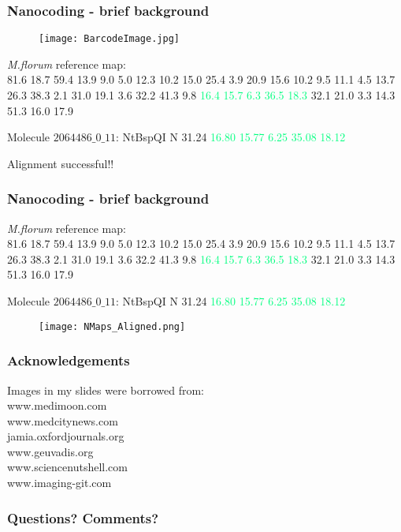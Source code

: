 \documentclass[10pt,dvipsnames,table, notes]{beamer}
\begin{document}
\begin{frame}
\frametitle{Nanocoding - brief background}
\begin{figure}[T]
\texttt{[image: BarcodeImage.jpg]}
\end{figure}

{\emph{M.florum}} reference map: \\
81.6 18.7 59.4 13.9 9.0 5.0 12.3 10.2 15.0 25.4 3.9 20.9 15.6 10.2 9.5 11.1 4.5 
13.7 26.3 38.3 2.1 31.0 19.1 3.6 32.2 41.3 9.8 \textcolor<3>{SpringGreen}{16.4 15.7 6.3 36.5 18.3} 32.1 21.0 
3.3 14.3 51.3 16.0 17.9

\pause
Molecule $2064486\_0\_11$: NtBspQI N  31.24  \textcolor<3>{SpringGreen}{16.80  15.77  6.25  35.08  18.12}

Alignment successful!!
\end{frame}

\begin{frame}
\frametitle{Nanocoding - brief background}
{\emph{M.florum}} reference map: \\
81.6 18.7 59.4 13.9 9.0 5.0 12.3 10.2 15.0 25.4 3.9 20.9 15.6 10.2 9.5 11.1 4.5 
13.7 26.3 38.3 2.1 31.0 19.1 3.6 32.2 41.3 9.8 \textcolor{SpringGreen}{16.4 15.7 6.3 36.5 18.3} 32.1 21.0 
3.3 14.3 51.3 16.0 17.9

Molecule $2064486\_0\_11$: NtBspQI N  31.24  \textcolor{SpringGreen}{16.80  15.77  6.25  35.08  18.12}

\begin{figure}[T]
\texttt{[image: NMaps\_Aligned.png]}
\end{figure}

\end{frame}

\begin{frame}
\frametitle{Acknowledgements}
Images in my slides were borrowed from: \\
www.medimoon.com \\
www.medcitynews.com \\
jamia.oxfordjournals.org \\
www.geuvadis.org \\
www.sciencenutshell.com \\
www.imaging-git.com \\

\end{frame}

\begin{frame}
\frametitle{Questions? Comments?}

\end{frame}
\end{document}

